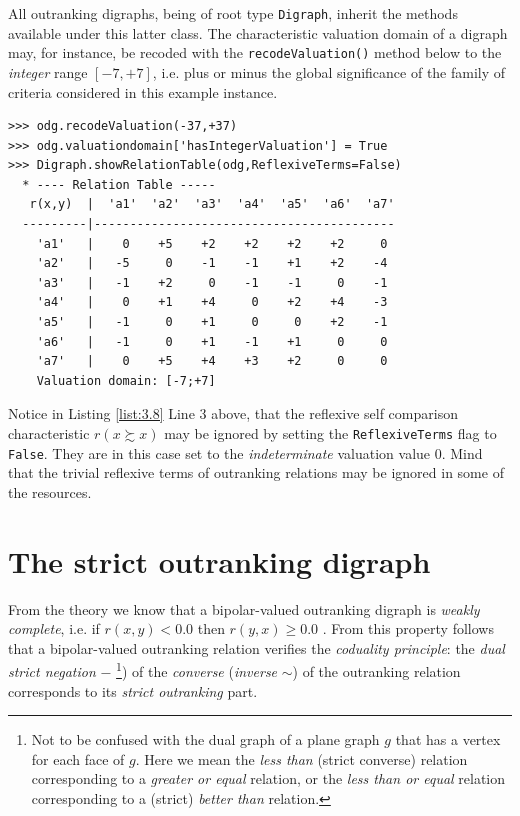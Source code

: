 All outranking digraphs, being of root type {\tt Digraph}, inherit the methods available under this latter class. The characteristic valuation domain of a digraph may, for instance,  be recoded with the {\tt recodeValuation()} method below to the {\em integer\/} range $[-7,+7]$, i.e. plus or minus the global significance of the family of criteria considered in this example instance.
\begin{lstlisting}[caption={Recoding the digraph valuation},label=list:3.8]
>>> odg.recodeValuation(-37,+37)
>>> odg.valuationdomain['hasIntegerValuation'] = True
>>> Digraph.showRelationTable(odg,ReflexiveTerms=False)
  * ---- Relation Table -----
   r(x,y)  |  'a1'  'a2'  'a3'  'a4'  'a5'  'a6'  'a7'	  
  ---------|------------------------------------------
    'a1'   |    0    +5    +2    +2    +2    +2     0	 
    'a2'   |   -5     0    -1    -1    +1    +2    -4	 
    'a3'   |   -1    +2     0    -1    -1     0    -1	 
    'a4'   |    0    +1    +4     0    +2    +4    -3	 
    'a5'   |   -1     0    +1     0     0    +2    -1	 
    'a6'   |   -1     0    +1    -1    +1     0     0	 
    'a7'   |    0    +5    +4    +3    +2     0     0	 
    Valuation domain: [-7;+7]
\end{lstlisting}
Notice in Listing \ref{list:3.8} Line 3 above, that the reflexive self comparison characteristic $r(x \succsim x)$ may be ignored by setting the \texttt{ReflexiveTerms} flag to \texttt{False}. They are in this case set to the \emph{indeterminate} valuation value $0$. Mind that the trivial reflexive terms of outranking relations may be ignored in some of the \Digraph resources. 

\section{The strict outranking digraph}
\label{sec:3.5}

From the theory we know that a bipolar-valued outranking digraph is \emph{weakly complete}, i.e. if $r(x,y) < 0.0$ then $r(y,x) \geq 0.0$ \citep{BIS-2013, ADT-L7}. From this property follows that a bipolar-valued outranking relation verifies the \emph{coduality principle}: the \emph{dual strict negation} $-$ \footnote{Not to be confused with the dual graph of a plane graph $g$ that has a vertex for each face of $g$. Here we mean the \emph{less than} (strict converse) relation corresponding to a \emph{greater or equal} relation, or the \emph{less than or equal} relation corresponding to a (strict) \emph{better than} relation.}) of the \emph{converse} ({\em inverse\/} $\sim$) of the outranking relation corresponds to its {\em strict outranking\/} part.

